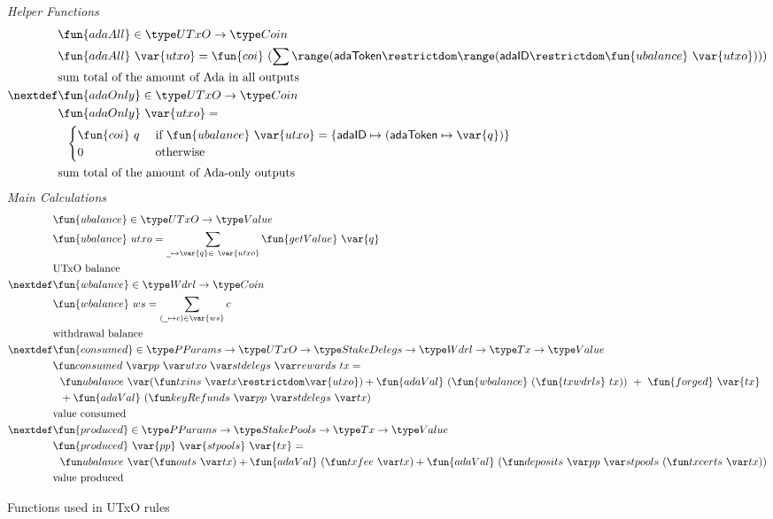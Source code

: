 \begin{figure}[htb]
  \emph{Helper Functions}
  \begin{align*}
    & \fun{adaAll} \in \UTxO \to \Coin \\
    & \fun{adaAll}~{\var{utxo}} = \fun{coi}~
          (\sum  \range ({\mathsf{adaToken}} \restrictdom \range ({\mathsf{adaID}} \restrictdom
          \fun{ubalance}~\var{utxo}))) \\
    & \text{sum total of the amount of Ada in all outputs} \\
    \nextdef
    & \fun{adaOnly} \in \UTxO \to \Coin \\
    & \fun{adaOnly}~{\var{utxo}} = \\
    & ~~\begin{cases}
          \fun{coi}~{q} ~& \text{if}~\fun{ubalance}~\var{utxo} = \{\mathsf{adaID} \mapsto
          (\mathsf{adaToken} \mapsto \var{q})\} \\
          0 & \text{otherwise}
      \end{cases}\\
    & \text{sum total of the amount of Ada-only outputs} \\
  \end{align*}
  \emph{Main Calculations}
  \begin{align*}
    & \fun{ubalance} \in \UTxO \to \Value \\
    & \fun{ubalance} ~ utxo = \sum_{\wcard\mapsto\var{q}\in~\var{utxo}}
    \fun{getValue}~\var{q} \\
    & \text{UTxO balance} \\
    \nextdef
    & \fun{wbalance} \in \Wdrl \to \Coin \\
    & \fun{wbalance} ~ ws = \sum_{(\wcard\mapsto c)\in\var{ws}} c \\
    & \text{withdrawal balance} \\
    \nextdef
    & \fun{consumed} \in \PParams \to \UTxO \to \StakeDelegs \to \Wdrl \to \Tx \to \Value \\
    & \consumed{pp}{utxo}{stdelegs}{rewards}~{tx} = \\
    & ~~\ubalance{(\txins{tx} \restrictdom \var{utxo})} +
        \fun{adaVal}~(\fun{wbalance}~(\fun{txwdrls}~{tx}))~+~\fun{forged}~\var{tx} \\
    & ~~ + \fun{adaVal}~(\keyRefunds{pp}{stdelegs}{tx}) \\
    & \text{value consumed} \\
    \nextdef
    & \fun{produced} \in \PParams \to \StakePools \to \Tx \to \Value \\
    & \fun{produced}~\var{pp}~\var{stpools}~\var{tx} = \\
    &~~\ubalance{(\outs{tx})}
    + \fun{adaVal}~(\txfee{tx}) + \fun{adaVal}~(\deposits{pp}{stpools}~{(\txcerts{tx})})\\
    & \text{value produced} \\
  \end{align*}
  \caption{Functions used in UTxO rules}
  \label{fig:functions:utxo}
\end{figure}

